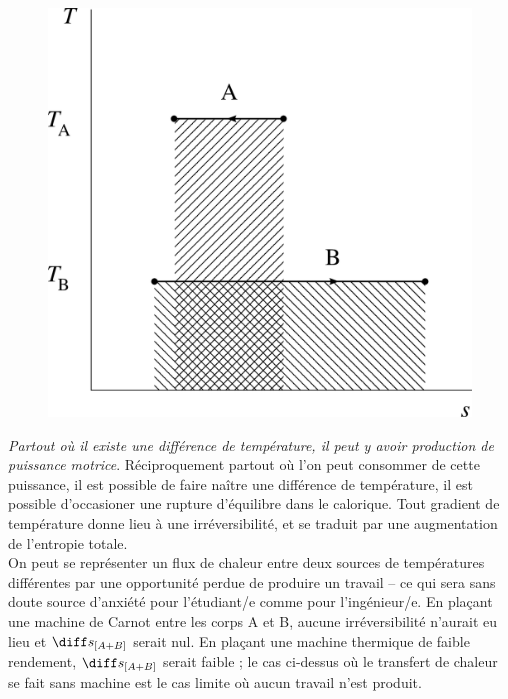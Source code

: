 		\begin{figure}
			\begin{center}
				\includegraphics[width=\didacticpvdiagramwidth]{images/ts_echange_chaleur.png}
			\end{center}
			\label{fig_expérience_création_entropie_t-s}
		\end{figure}

			\emph{Partout où il existe une différence de température, il peut y avoir production de puissance motrice}. Réciproquement partout où l’on peut consommer de cette puissance, il est possible de faire naître une différence de température, il est possible d’occasioner une rupture d’équilibre dans le calorique.
		Tout gradient de température donne lieu à une irréversibilité, et se traduit par une augmentation de l’entropie totale. \\
		On peut se représenter un flux de chaleur entre deux sources de températures différentes par une opportunité perdue de produire un travail -- ce qui sera sans doute source d’anxiété pour l’étudiant/e comme pour l’ingénieur/e. En plaçant une machine de Carnot entre les corps A et B, aucune irréversibilité n’aurait eu lieu et $\diff s_{[A+B]}$ serait nul. En plaçant une machine thermique de faible rendement, $\diff s_{[A+B]}$ serait faible ; le cas ci-dessus où le transfert de chaleur se fait sans machine est le cas limite où aucun travail n’est produit.\onlyframabook{\dontbreakpage}

